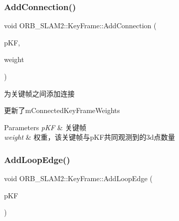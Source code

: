 \mbox{\label{class_o_r_b___s_l_a_m2_1_1_key_frame_a8d21a23485b7c104a73d6ad3cccf4e93}} 
\subsubsection{\texorpdfstring{Add\+Connection()}{AddConnection()}}
{\footnotesize\ttfamily void O\+R\+B\+\_\+\+S\+L\+A\+M2\+::\+Key\+Frame\+::\+Add\+Connection (\begin{DoxyParamCaption}\item[{\mbox{\hyperlink{class_o_r_b___s_l_a_m2_1_1_key_frame}{Key\+Frame}} $\ast$}]{p\+KF,  }\item[{const int \&}]{weight }\end{DoxyParamCaption})}



为关键帧之间添加连接 

更新了m\+Connected\+Key\+Frame\+Weights 
\begin{DoxyParams}{Parameters}
{\em p\+KF} & 关键帧 \\
\hline
{\em weight} & 权重，该关键帧与p\+K\+F共同观测到的3d点数量 \\
\hline
\end{DoxyParams}
\mbox{\label{class_o_r_b___s_l_a_m2_1_1_key_frame_aca519e7486b0e6f1fd6c98d7ced920b8}} 
\subsubsection{\texorpdfstring{Add\+Loop\+Edge()}{AddLoopEdge()}}
{\footnotesize\ttfamily void O\+R\+B\+\_\+\+S\+L\+A\+M2\+::\+Key\+Frame\+::\+Add\+Loop\+Edge (\begin{DoxyParamCaption}\item[{\mbox{\hyperlink{class_o_r_b___s_l_a_m2_1_1_key_frame}{Key\+Frame}} $\ast$}]{p\+KF }\end{DoxyParamCaption})}

